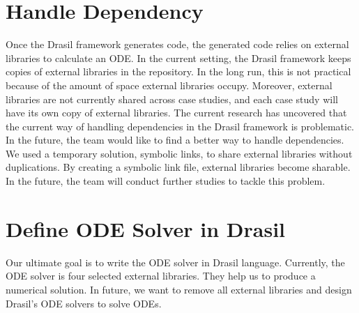 \section{Handle Dependency}
Once the Drasil framework generates code, the generated code relies on external libraries to calculate an ODE. In the current setting, the Drasil framework keeps copies of external libraries in the repository. In the long run, this is not practical because of the amount of space external libraries occupy. Moreover, external libraries are not currently shared across case studies, and each case study will have its own copy of external libraries. The current research has uncovered that the current way of handling dependencies in the Drasil framework is problematic. In the future, the team would like to find a better way to handle dependencies. We used a temporary solution, symbolic links, to share external libraries without duplications. By creating a symbolic link file, external libraries become sharable. In the future, the team will conduct further studies to tackle this problem.

\section{Define ODE Solver in Drasil}
Our ultimate goal is to write the ODE solver in Drasil language. Currently, the ODE solver is four selected external libraries. They help us to produce a numerical solution. In future, we want to remove all external libraries and design Drasil's ODE solvers to solve ODEs. 
